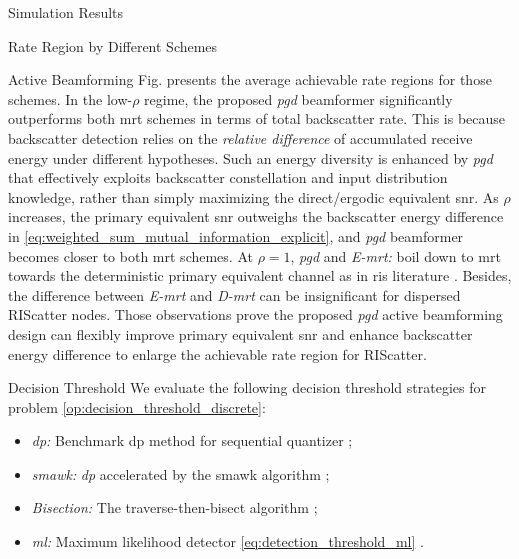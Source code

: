 \documentclass[journal]{IEEEtran}
\begin{document}
\begin{section}{Simulation Results}
\begin{subsection}{Rate Region by Different Schemes}
\begin{subsubsection}{Active Beamforming}
			Fig.  presents the average achievable rate regions for those schemes.
			In the low-$\rho$ regime, the proposed \emph{\gls{pgd}} beamformer significantly outperforms both \gls{mrt} schemes in terms of total backscatter rate.
			This is because backscatter detection relies on the \emph{relative difference} of accumulated receive energy under different hypotheses.
			Such an energy diversity is enhanced by \emph{\gls{pgd}} that effectively exploits backscatter constellation and input distribution knowledge, rather than simply maximizing the direct/ergodic equivalent \gls{snr}.
			As $\rho$ increases, the primary equivalent \gls{snr} outweighs the backscatter energy difference in \eqref{eq:weighted_sum_mutual_information_explicit}, and \emph{\gls{pgd}} beamformer becomes closer to both \gls{mrt} schemes.
			At $\rho=1$, \emph{\gls{pgd}} and \emph{E-\gls{mrt}:} boil down to \gls{mrt} towards the deterministic primary equivalent channel as in \gls{ris} literature \cite{Wu2019}.
			Besides, the difference between \emph{E-\gls{mrt}} and \emph{D-\gls{mrt}} can be insignificant for dispersed RIScatter nodes.
			Those observations prove the proposed \emph{\gls{pgd}} active beamforming design can flexibly improve primary equivalent \gls{snr} and enhance backscatter energy difference to enlarge the achievable rate region for RIScatter.
		\end{subsubsection}

		\begin{subsubsection}{Decision Threshold}
			We evaluate the following decision threshold strategies for problem \eqref{op:decision_threshold_discrete}:
			\begin{itemize}
				\item \emph{\gls{dp}:} Benchmark \gls{dp} method for sequential quantizer \cite{He2021};
				\item \emph{\gls{smawk}:} \emph{\gls{dp}} accelerated by the \gls{smawk} algorithm \cite{He2021};
				\item \emph{Bisection:} The traverse-then-bisect algorithm \cite{Nguyen2020a};
				\item \emph{\gls{ml}:} Maximum likelihood detector \eqref{eq:detection_threshold_ml} \cite{Qian2019}.
			\end{itemize}


\end{subsubsection}
\end{subsection}
\end{section}
\end{document}
